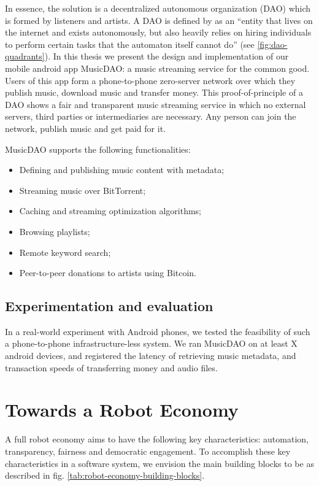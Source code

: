 In essence, the solution is a decentralized autonomous organization (DAO) which is formed by listeners and artists. A DAO is defined by \cite{buterin2014dao} as an ``entity that lives on the internet and exists autonomously, but also heavily relies on hiring individuals to perform certain tasks that the automaton itself cannot do'' (see \ref{fig:dao-quadrants}). In this thesis we present the design and implementation of our mobile android app MusicDAO: a music streaming service for the common good. Users of this app form a phone-to-phone zero-server network over which they publish music, download music and transfer money. This proof-of-principle of a DAO shows a fair and transparent music streaming service in which no external servers, third parties or intermediaries are necessary. Any person can join the network, publish music and get paid for it. 

MusicDAO supports the following functionalities:
\begin{itemize}
    \item Defining and publishing music content with metadata;
    \item Streaming music over BitTorrent;
    \item Caching and streaming optimization algorithms;
    \item Browsing playlists;
    \item Remote keyword search;
    \item Peer-to-peer donations to artists using Bitcoin.
\end{itemize}

\subsection{Experimentation and evaluation}
In a real-world experiment with Android phones, we tested the feasibility of such a phone-to-phone infrastructure-less system. We ran MusicDAO on at least X android devices, and registered the latency of retrieving music metadata, and transaction speeds of transferring money and audio files. 

\section{Towards a Robot Economy}
A full robot economy aims to have the following key characteristics: automation, transparency, fairness and democratic engagement. To accomplish these key characteristics in a software system, we envision the main building blocks to be as described in fig. \ref{tab:robot-economy-building-blocks}.

